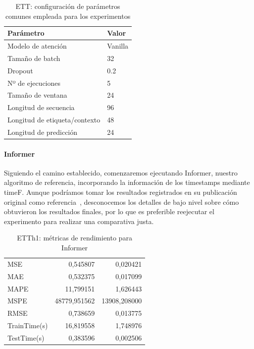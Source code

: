 \begin{table}[!ht]
	\centering
	\begin{tabular}{l|l}
		\toprule
		Parámetro & Valor \\
		\midrule
		{Modelo de atención} & Vanilla \\
		{Tamaño de batch} & 32 \\
		{Dropout} & 0.2 \\
		{Nº de ejecuciones} & 5 \\
		{Tamaño de ventana} & 24 \\
		{Longitud de secuencia} & 96 \\
		{Longitud de etiqueta/contexto} & 48 \\
		{Longitud de predicción} & 24 \\
		\bottomrule
	\end{tabular}
	\caption{ETT: configuración de parámetros comunes empleada para los experimentos}
	\label{ajustesett}
\end{table}

\paragraph{Informer}

Siguiendo el camino establecido, comenzaremos ejecutando Informer, nuestro algoritmo de referencia, incorporando la información de los timestamps mediante timeF. Aunque podríamos tomar los resultados registrados en su publicación original como referencia~\cite{zhou2021informerefficienttransformerlong}, desconocemos los detalles de bajo nivel sobre cómo obtuvieron los resultados finales, por lo que es preferible reejecutar el experimento para realizar una comparativa justa.

\begin{table}[!ht]
	\centering
	\begin{tabular}{l|N|N}
		\toprule
		 &  &  \\
		\midrule
		MSE & 0,545807 & 0,020421 \\
		MAE & 0,532375 & 0,017099 \\
		MAPE & 11,799151 & 1,626443 \\
		MSPE & 48779,951562 & 13908,208000 \\
		RMSE & 0,738659 & 0,013775 \\
		TrainTime(s) & 16,819558 & 1,748976 \\
		TestTime(s) & 0,383596 & 0,002506 \\
		\bottomrule
	\end{tabular}
	\caption{ETTh1: métricas de rendimiento para Informer}
	\label{etth1informer}
\end{table}


